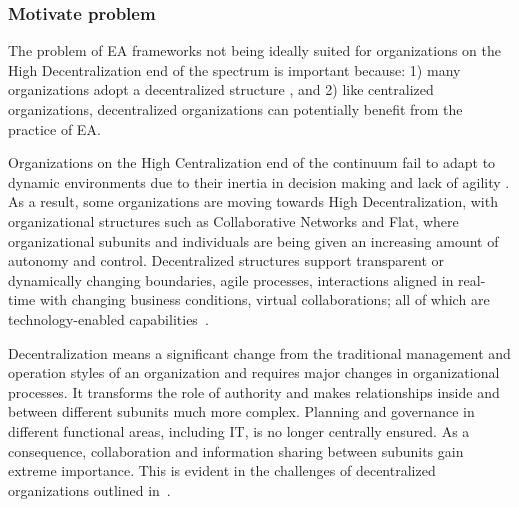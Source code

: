 
\subsubsection{Motivate problem} %

The problem of EA frameworks not being ideally suited for organizations on the High Decentralization end of the spectrum is important because: 1) many organizations adopt a decentralized structure \cite{acemoglu2007technology,fulk1995}, and 2) like centralized organizations, decentralized organizations can potentially benefit from the practice of EA.

Organizations on the High Centralization end of the continuum fail to adapt to dynamic environments due to their inertia in decision making and lack of agility \cite{fulk1995,pearlson2009}. As a result, some organizations are moving towards High Decentralization, with organizational structures such as Collaborative Networks \cite{Camarinha-Matos2005} and Flat, where organizational subunits and individuals are being given an increasing amount of autonomy and control. Decentralized structures support transparent or dynamically changing boundaries, agile processes, interactions aligned in real-time with changing business conditions, virtual collaborations; all of which are technology-enabled capabilities~\cite{applegate1988,fulk1995}.

Decentralization means a significant change from the traditional management and operation styles of an organization and requires major changes in organizational processes. It transforms the role of authority and makes relationships inside and between different subunits much more complex. Planning and governance in different functional areas, including IT, is no longer centrally ensured. As a consequence, collaboration and information sharing between subunits gain extreme importance. This is evident in the challenges of decentralized organizations outlined in~\cite{caruso2008boundaries}.  


